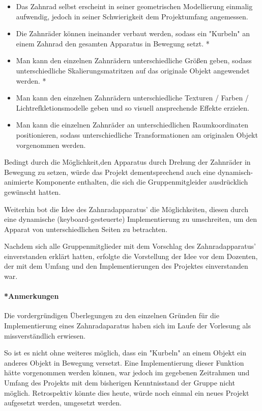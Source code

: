 \documentclass{article}
\begin{document}
\begin{itemize}
    \item Das Zahnrad selbst erscheint in seiner geometrischen Modellierung einmalig aufwendig, jedoch in seiner Schwierigkeit dem Projektumfang angemessen. 
    \item Die Zahnräder können ineinander verbaut werden, sodass ein "Kurbeln" an einem Zahnrad den gesamten Apparatus in Bewegung setzt. *
    \item Man kann den einzelnen Zahnrädern unterschiedliche Größen geben, sodass unterschiedliche Skalierungsmatritzen auf das originale Objekt angewendet werden. *
    \item Man kann den einzelnen Zahnrädern unterschiedliche Texturen / Farben / Lichtrefkletionsmodelle geben und so visuell ansprechende Effekte erzielen. 
    \item Man kann die einzelnen Zahnräder an unterschiedlichen Raumkoordinaten positionieren, sodass unterschiedliche Transformationen am originalen Objekt vorgenommen werden. 
\end{itemize}

Bedingt durch die Möglichkeit,den Apparatus durch Drehung der Zahnräder in Bewegung zu setzen, würde das Projekt dementsprechend auch eine dynamisch-animierte Komponente enthalten, die sich die Gruppenmitgleider ausdrücklich gewünscht hatten. 

Weiterhin bot die Idee des Zahnradapparatus' die Möglichkeiten, diesen durch eine dynamische (keyboard-gesteuerte) Implementierung zu umschreiten, um den Apparat von unterschiedlichen Seiten zu betrachten. 

Nachdem sich alle Gruppenmitglieder mit dem Vorschlag des Zahnradapparatus' einverstanden erklärt hatten, erfolgte die Vorstellung der Idee vor dem Dozenten, der mit dem Umfang und den Implementierungen des Projektes einverstanden war. 



\paragraph{*Anmerkungen}
Die vordergründigen Überlegungen zu den einzelnen Gründen für die Implementierung eines Zahnradaparatus haben sich im Laufe der Vorlesung als missverständlich erwiesen. 

So ist es nicht ohne weiteres möglich, dass ein "Kurbeln" an einem Objekt ein anderes Objekt in Bewegung versetzt. 
Eine Implementierung dieser Funktion hätte vorgenommen werden können, war jedoch im gegebenen Zeitrahmen und Umfang des Projekts mit dem bisherigen Kenntnisstand der Gruppe nicht möglich. 
Retrospektiv könnte dies heute, würde noch einmal ein neues Projekt aufgesetzt werden, umgesetzt werden. 
\end{document}
